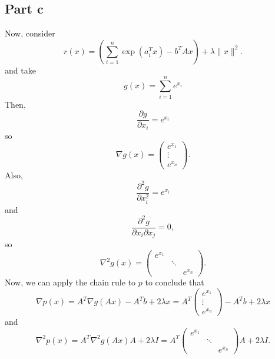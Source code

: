 \documentclass{article}
\begin{document}
\subsection{Part c}
Now, consider \[
r(x)=\left(\sum_{i=1}^n \exp(a_i^Tx)- b^TAx\right) + \lambda \|x\|^2.
\]
and take 
\[
g(x)=\sum_{i=1}^n e^{x_i}
\]
Then, 
\[
\frac{\partial g}{\partial x_i}=e^{x_i}
\]
so
\[
\nabla g(x)=\begin{pmatrix}e^{x_1}\\\vdots\\e^{x_n}\end{pmatrix}.
\]
Also, 
\[
\frac{\partial^2 g}{\partial x_i^2}=e^{x_i}
\]
and 
\[
\frac{\partial^2 g}{\partial x_i\partial x_j}=0,
\]
so 
\[
\nabla^2 g(x)=
\begin{pmatrix}
e^{x_1}\\
& \ddots\\
&& e^{x_n}
\end{pmatrix}.
\]
Now, we can apply the chain rule to $p$ to conclude that 
\[
\nabla p(x)=A^T\nabla g(Ax)-A^Tb+2\lambda x=A^T\begin{pmatrix}e^{x_1}\\\vdots\\e^{x_n}\end{pmatrix}-A^Tb+2\lambda x
\]
and 
\[
\nabla^2 p(x)=A^T\nabla^2g(Ax)A+2\lambda I=A^T\begin{pmatrix}
e^{x_1}\\
& \ddots\\
&& e^{x_n}
\end{pmatrix}A+2\lambda I.
\]
\end{document}
